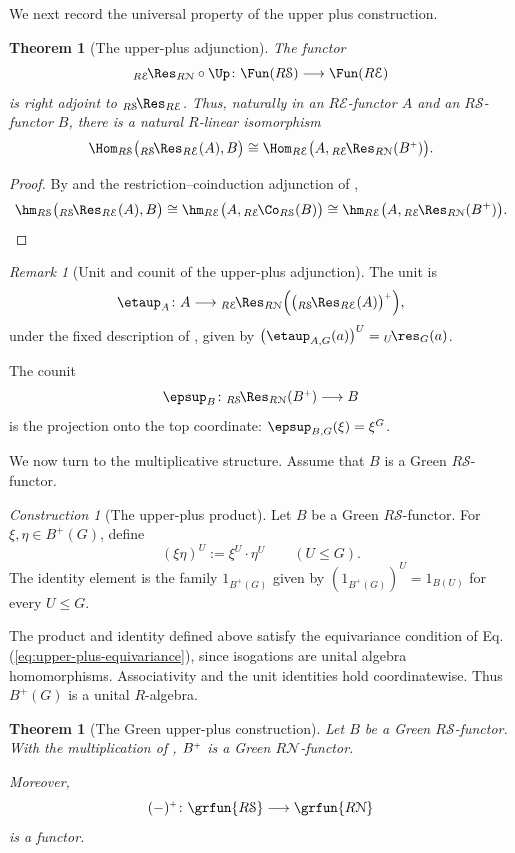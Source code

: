 \documentclass{amsart}
\numberwithin{equation}{section}%
\newtheorem{Thm}[equation]{Theorem}
\theoremstyle{remark}
\newtheorem{Rem}[equation]{Remark}
\newtheorem{Cons}[equation]{Construction}
\theoremstyle{definition}
\newcommand{\e}{\mathcal E}
\newcommand{\s}{\mathcal S}
\newcommand{\n}{\mathcal N}
\newcommand{\lres}[1]{{}_{#1}\!\res}
\newcommand{\lCo}[1]{{}_{#1}\!\Co}
\newcommand{\iRes}[2]{{}_{#1}\!\Res_{#2}}
\begin{document}
%
We next record the universal property of the upper plus construction.
%
\begin{Thm}[The upper-plus adjunction]
\label{thm:upper-plus-adjunction}
The functor
\[
\iRes{R\e}{R\n} \circ \Up
\colon
\Fun(R\s)
\longrightarrow
\Fun(R\e)
\]
is right adjoint to
$\iRes{R\s}{R\e}$.
Thus, naturally in an $R\e$-functor $A$ and an
$R\s$-functor $B$, there is a natural $R$-linear isomorphism
%
\[
\Hom_{R\s}
\bigl(
\iRes{R\s}{R\e}(A),B
\bigr)
\cong
\Hom_{R\e}
\bigl(
A,\iRes{R\e}{R\n}(\Bup)
\bigr).
\]
%
\end{Thm}
%
\begin{proof}
By  and the
restriction--coinduction adjunction of
,
%
\[
\hm_{R\s}
\bigl(
\iRes{R\s}{R\e}(A),B
\bigr)
\cong
\hm_{R\e}
\bigl(
A,{}\lCo{R\e}_{R\s}(B)
\bigr)
\cong
\hm_{R\e}
\bigl(
A, \iRes{R\e}{R\n}(B^+)
\bigr).
\]
%
\end{proof}
%
\begin{Rem}[Unit and counit of the upper-plus adjunction]
\label{rem:upper-plus-unit-counit}
The unit is
\[
\etaup_A
\colon
A
\longrightarrow
\iRes{R\e}{R\n}
\Bigl(
\Bup[\big(\iRes{R\s}{R\e}(A)\big)]
\Bigr),
\]
under the fixed description of
, given by
$\bigl(\etaup_{A,G}(a)\bigr)^U
=
\lres{U}_G(a)$.

The counit
\[
\epsup_B
\colon
\iRes{R\s}{R\n}
(\Bup)
\longrightarrow
B
\]
is the projection onto the top coordinate:
$\epsup_{B,G}(\xi)=\xi^G$.
\end{Rem}
%
We now turn to the multiplicative structure. Assume that $B$ is a
Green $R\s$-functor.
%
\begin{Cons}[The upper-plus product]
\label{con:upper-plus-product}
Let $B$ be a Green $R\s$-functor.
For $\xi,\eta\in B^+(G)$, define
%
\[
(\xi\eta)^U
:=
\xi^U\cdot\eta^U
\qquad
(U\leq G).
\]
%
The identity element is the family $1_{B^+(G)}$ given by
$(1_{B^+(G)})^U
=
1_{B(U)}$ for every
$U\leq G$.

The product and identity defined above satisfy the equivariance
condition of Eq. (\ref{eq:upper-plus-equivariance}), since isogations
are unital algebra homomorphisms.
Associativity and the unit identities hold coordinatewise.
Thus $B^+(G)$ is a unital $R$-algebra.
\end{Cons}
%
\begin{Thm}[The Green upper-plus construction]
\label{thm:upper-plus-Green}
Let $B$ be a Green $R\s$-functor. With the multiplication of
,
$\Bup$
is a Green $R\n$-functor.

Moreover,
\[
(-)^{\scriptscriptstyle+}
\colon
\grfun{R\s}
\longrightarrow
\grfun{R\n}
\]
is a functor.
\end{Thm}
\end{document}
